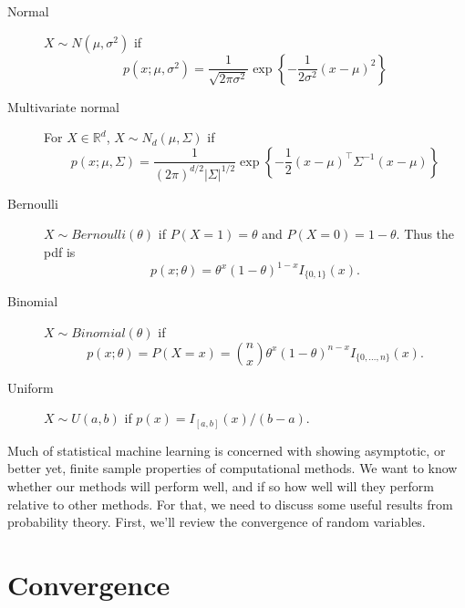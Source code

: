 \documentclass[10pt]{article}
\newcommand{\R}{\mathbb{R}}
\begin{document}
\begin{description}
\item[Normal] $X\sim N(\mu,\sigma^2)$ if
  \begin{equation}
    \label{eq:7}
    p(x;\mu,\sigma^2) =
    \frac{1}{\sqrt{2\pi\sigma^2}}\exp\left\{-\frac{1}{2\sigma^2}(x-\mu)^2\right\} 
  \end{equation}
\item[Multivariate normal] For $X\in \R^d$, $X\sim N_d(\mu, \Sigma)$ if
  \begin{equation}
    \label{eq:15}
    p(x;\mu,\Sigma) = \frac{1}{(2\pi)^{d/2}|\Sigma|^{1/2}}\exp\left\{-\frac{1}{2}(x-\mu)^\top\Sigma^{-1}(x-\mu)\right\} 
  \end{equation}
\item[Bernoulli] $X\sim Bernoulli(\theta)$ if $P(X=1)=\theta$ and
  $P(X=0) = 1-\theta$. Thus the pdf is
  \begin{equation}
    \label{eq:16}
    p(x;\theta) = \theta^x(1-\theta)^{1-x} I_{\{0,1\}}(x).
  \end{equation}
\item[Binomial] $X\sim Binomial(\theta)$ if
  \begin{equation}
    \label{eq:17}
    p(x;\theta) = P(X=x) = \binom{n}{x}\theta^x(1-\theta)^{n-x}I_{\{0,\ldots,n\}}(x).
  \end{equation}
\item[Uniform] $X\sim U(a,b)$ if $p(x) = I_{[a,b]}(x)/(b-a).$
\end{description}


Much of statistical machine learning is concerned with showing
asymptotic, or better yet, finite sample properties of computational
methods. We want to know whether our methods will perform well, and if
so how well will they perform relative to other methods. For that, we
need to discuss some useful results from probability theory. First,
we'll review the convergence of random variables.

\section{Convergence}
\label{sec:convergence}
\end{document}
